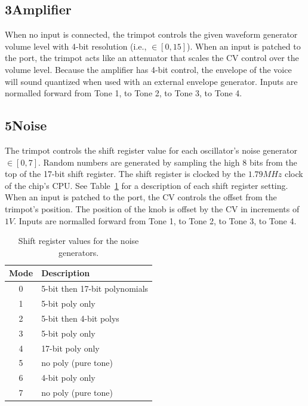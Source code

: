 \documentclass[12pt,letter]{article}
\begin{document}
\subsection*{3{\quad}Amplifier}

When no input is connected, the trimpot controls the given waveform generator volume level with 4-bit resolution (i.e., $\in [0, 15]$). When an input is patched to the port, the trimpot acts like an attenuator that scales the CV control over the volume level. Because the amplifier has 4-bit control, the envelope of the voice will sound quantized when used with an external envelope generator. Inputs are normalled forward from Tone 1, to Tone 2, to Tone 3, to Tone 4.

\subsection*{5{\quad}Noise}

The trimpot controls the shift register value for each oscillator's noise generator $\in [0, 7]$. Random numbers are generated by sampling the high 8 bits from the top of the 17-bit shift register. The shift register is clocked by the $1.79MHz$ clock of the chip's CPU. See Table~\ref{tab:shift-register} for a description of each shift register setting. When an input is patched to the port, the CV controls the offset from the trimpot's position. The position of the knob is offset by the CV in increments of $1V$. Inputs are normalled forward from Tone 1, to Tone 2, to Tone 3, to Tone 4.

\begin{table}[!htp]
\centering
\caption{Shift register values for the noise generators.}
\label{tab:shift-register}
\small
\begin{tabular}{|c||l|}
\hline
Mode & Description                   \\
\hline\hline
 0    & 5-bit then 17-bit polynomials \\
 1    & 5-bit poly only               \\
 2    & 5-bit then 4-bit polys        \\
 3    & 5-bit poly only               \\
 4    & 17-bit poly only              \\
 5    & no poly (pure tone)           \\
 6    & 4-bit poly only               \\
 7    & no poly (pure tone)           \\
\hline
\end{tabular}
\end{table}
\end{document}
